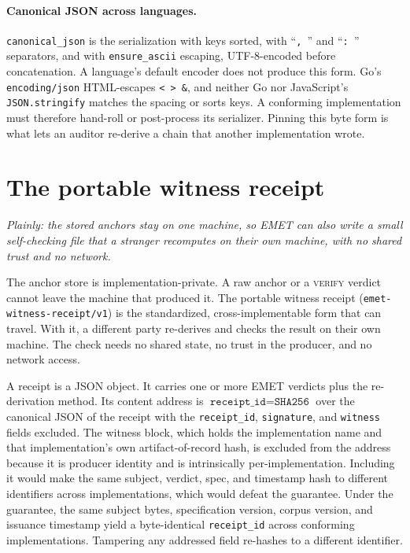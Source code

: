 \documentclass[11pt]{article}
\begin{document}
\paragraph{Canonical JSON across languages.} \texttt{canonical\_json} is the serialization with keys sorted, with ``\texttt{,\ }'' and ``\texttt{:\ }'' separators, and with \texttt{ensure\_ascii} escaping, UTF-8-encoded before concatenation. A language's default encoder does not produce this form. Go's \texttt{encoding/json} HTML-escapes \texttt{< > \&}, and neither Go nor JavaScript's \texttt{JSON.stringify} matches the spacing or sorts keys. A conforming implementation must therefore hand-roll or post-process its serializer. Pinning this byte form is what lets an auditor re-derive a chain that another implementation wrote.
\section{The portable witness receipt}
\label{sec:receipt}
\emph{Plainly: the stored anchors stay on one machine, so EMET can also write a small self-checking file that a stranger recomputes on their own machine, with no shared trust and no network.}

The anchor store is implementation-private. A raw anchor or a \textsc{verify} verdict cannot leave the machine that produced it. The portable witness receipt (\texttt{emet-witness-receipt/v1}) is the standardized, cross-implementable form that can travel. With it, a different party re-derives and checks the result on their own machine. The check needs no shared state, no trust in the producer, and no network access.

A receipt is a JSON object. It carries one or more EMET verdicts plus the re-derivation method. Its content address is $\texttt{receipt\_id} = \texttt{SHA256}$ over the canonical JSON of the receipt with the \texttt{receipt\_id}, \texttt{signature}, and \texttt{witness} fields excluded. The witness block, which holds the implementation name and that implementation's own artifact-of-record hash, is excluded from the address because it is producer identity and is intrinsically per-implementation. Including it would make the same subject, verdict, spec, and timestamp hash to different identifiers across implementations, which would defeat the guarantee. Under the guarantee, the same subject bytes, specification version, corpus version, and issuance timestamp yield a byte-identical \texttt{receipt\_id} across conforming implementations. Tampering any addressed field re-hashes to a different identifier.
\end{document}
